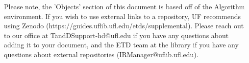 Please note, the 'Objects' section of this document is based off of the Algorithm environment. If you wish to use external links to a repository, UF recommends using Zenodo (https://guides.uflib.ufl.edu/etds/supplemental). Please reach out to our office at TandDSupport-hd@ufl.edu if you have any questions about adding it to your document, and the ETD team at the library if you have any questions about external repositories (IRManager@uflib.ufl.edu).